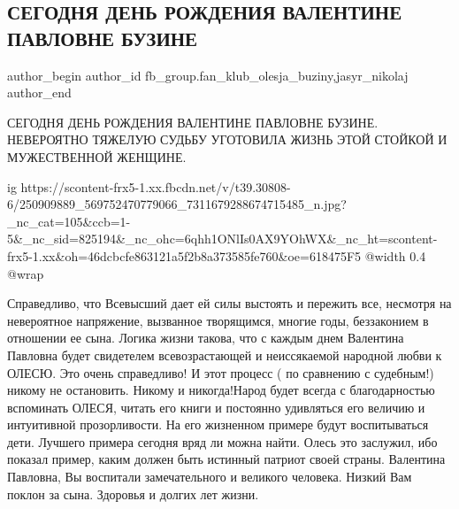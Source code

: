 
 
 
 
 
 
\subsection{СЕГОДНЯ ДЕНЬ РОЖДЕНИЯ ВАЛЕНТИНЕ ПАВЛОВНЕ БУЗИНЕ}
\label{sec:01_11_2021.fb.fb_group.fan_klub_olesja_buziny.1.buzina_vp_birthday}
 
\ifcmt
 author_begin
   author_id fb_group.fan_klub_olesja_buziny,jasyr_nikolaj
 author_end
\fi

СЕГОДНЯ ДЕНЬ РОЖДЕНИЯ ВАЛЕНТИНЕ ПАВЛОВНЕ БУЗИНЕ. НЕВЕРОЯТНО ТЯЖЕЛУЮ СУДЬБУ
УГОТОВИЛА ЖИЗНЬ ЭТОЙ СТОЙКОЙ И МУЖЕСТВЕННОЙ ЖЕНЩИНЕ. 

\ifcmt
  ig https://scontent-frx5-1.xx.fbcdn.net/v/t39.30808-6/250909889_569752470779066_7311679288674715485_n.jpg?_nc_cat=105&ccb=1-5&_nc_sid=825194&_nc_ohc=6qhh1ONlIs0AX9YOhWX&_nc_ht=scontent-frx5-1.xx&oh=46dcbcfe863121a5f2b8a373585fe760&oe=618475F5
  @width 0.4
  @wrap 
\fi

Справедливо, что Всевысший дает ей силы выстоять и пережить все, несмотря на
невероятное напряжение, вызванное творящимся, многие годы, беззаконием в
отношении ее сына. Логика жизни такова, что с каждым днем Валентина Павловна
будет свидетелем всевозрастающей и неиссякаемой народной любви к ОЛЕСЮ. Это
очень справедливо! И этот процесс ( по сравнению с судебным!) никому не
остановить. Никому и никогда!Народ будет всегда с благодарностью вспоминать
ОЛЕСЯ, читать его книги и постоянно удивляться его величию и интуитивной
прозорливости. На его жизненном примере будут воспитываться дети. Лучшего
примера сегодня вряд ли можна найти. Олесь это заслужил, ибо показал пример,
каким должен быть истинный патриот своей страны. Валентина Павловна, Вы
воспитали замечательного и великого человека. Низкий Вам поклон за сына.
Здоровья и долгих  лет жизни.
